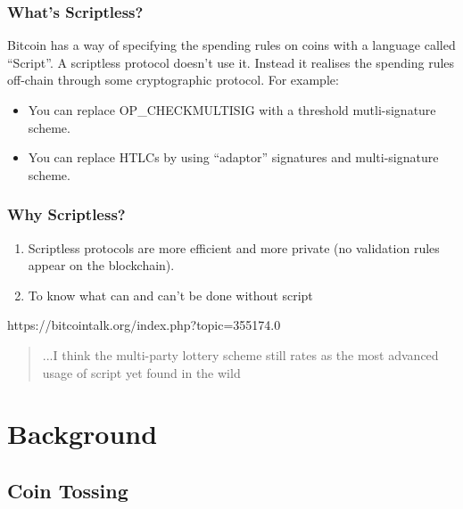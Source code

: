 \documentclass{beamer}
\begin{document}


\begin{frame}
\frametitle{What's Scriptless?}
Bitcoin has a way of specifying the spending rules on coins with a language called ``Script''. A scriptless protocol doesn't use it. Instead it realises the spending rules off-chain through some cryptographic protocol. For example:
\\ 

\begin{itemize}
    \item You can replace \textsf{OP\_CHECKMULTISIG} with a threshold mutli-signature scheme.
    \item You can replace HTLCs by using ``adaptor'' signatures and multi-signature scheme.
\end{itemize}

\end{frame}



\begin{frame}
\frametitle{Why Scriptless?}

    \begin{enumerate}
       \item<1-> Scriptless protocols are more efficient and more private (no validation rules appear on the blockchain).
       \item<2-> To know what can and can't be done without script
    \end{enumerate}
    
    \pause
    \pause

    https://bitcointalk.org/index.php?topic=355174.0
    \begin{quote}
     ...I think the multi-party lottery scheme still rates as the most advanced usage of script yet found in the wild
\end{quote}

\end{frame}



\section{Background}

\subsection{Coin Tossing}
\end{document}

